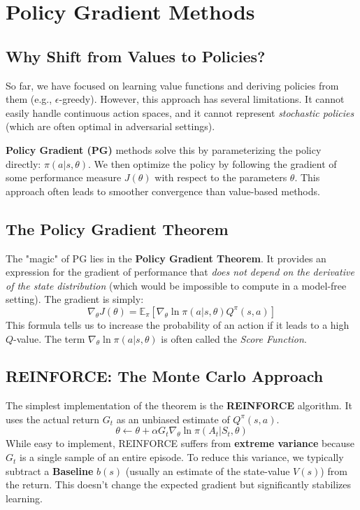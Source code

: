 \section{Policy Gradient Methods}

\subsection{Why Shift from Values to Policies?}
So far, we have focused on learning value functions and deriving policies from them (e.g., $\epsilon$-greedy). However, this approach has several limitations. It cannot easily handle continuous action spaces, and it cannot represent \textit{stochastic policies} (which are often optimal in adversarial settings). 

\textbf{Policy Gradient (PG)} methods solve this by parameterizing the policy directly: $\pi(a|s, \theta)$. We then optimize the policy by following the gradient of some performance measure $J(\theta)$ with respect to the parameters $\theta$. This approach often leads to smoother convergence than value-based methods.

\subsection{The Policy Gradient Theorem}
The "magic" of PG lies in the \textbf{Policy Gradient Theorem}. It provides an expression for the gradient of performance that \textit{does not depend on the derivative of the state distribution} (which would be impossible to compute in a model-free setting). The gradient is simply:
\[ \nabla_\theta J(\theta) = \mathbb{E}_{\pi} [ \nabla_\theta \ln \pi(a|s, \theta) Q^\pi(s, a) ] \]
This formula tells us to increase the probability of an action if it leads to a high $Q$-value. The term $\nabla_\theta \ln \pi(a|s, \theta)$ is often called the \textit{Score Function}.

\subsection{REINFORCE: The Monte Carlo Approach}
The simplest implementation of the theorem is the \textbf{REINFORCE} algorithm. It uses the actual return $G_t$ as an unbiased estimate of $Q^\pi(s, a)$.
\[ \theta \leftarrow \theta + \alpha G_t \nabla_\theta \ln \pi(A_t|S_t, \theta) \]
While easy to implement, REINFORCE suffers from \textbf{extreme variance} because $G_t$ is a single sample of an entire episode. To reduce this variance, we typically subtract a \textbf{Baseline} $b(s)$ (usually an estimate of the state-value $V(s)$) from the return. This doesn't change the expected gradient but significantly stabilizes learning.

